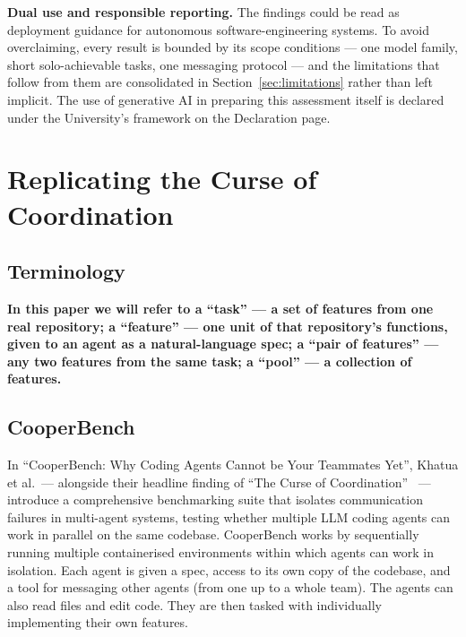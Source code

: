 \documentclass[11pt,a4paper]{article}
\begin{document}
\textbf{Dual use and responsible reporting.} The findings could be read as deployment guidance for autonomous software-engineering systems. To avoid overclaiming, every result is bounded by its scope conditions --- one model family, short solo-achievable tasks, one messaging protocol --- and the limitations that follow from them are consolidated in Section~\ref{sec:limitations} rather than left implicit. The use of generative AI in preparing this assessment itself is declared under the University's framework on the Declaration page.

%
%
\section{Replicating the Curse of Coordination}\label{sec:replication}

\subsection{Terminology}\label{sec:terminology}

\textbf{In this paper we will refer to a ``task'' --- a set of features from one real repository; a ``feature'' --- one unit of that repository's functions, given to an agent as a natural-language spec; a ``pair of features'' --- any two features from the same task; a ``pool'' --- a collection of features.}

\subsection{CooperBench}\label{sec:cooperbench}

In ``CooperBench: Why Coding Agents Cannot be Your Teammates Yet'', Khatua et al.\ --- alongside their headline finding of ``The Curse of Coordination''~\cite{khatua2026cooperbench} --- introduce a comprehensive benchmarking suite that isolates communication failures in multi-agent systems, testing whether multiple LLM coding agents can work in parallel on the same codebase. CooperBench works by sequentially running multiple containerised environments within which agents can work in isolation. Each agent is given a spec, access to its own copy of the codebase, and a tool for messaging other agents (from one up to a whole team). The agents can also read files and edit code. They are then tasked with individually implementing their own features.
\end{document}
